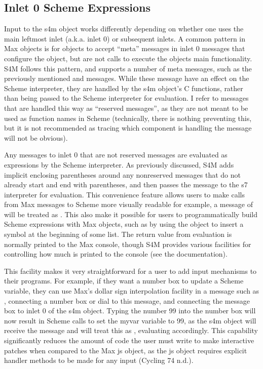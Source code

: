 \documentclass[letterpaper,10pt,english]{sphinxmanual}
\begin{document}
\subsection{Inlet 0 Scheme Expressions}
\label{\detokenize{features_usage:inlet-0-scheme-expressions}}
\sphinxAtStartPar
Input to the s4m object works differently depending on whether one uses the main left\sphinxhyphen{}most inlet (a.k.a. inlet 0) or subsequent inlets.
A common pattern in Max objects is for objects to accept “meta” messages in inlet 0 \sphinxhyphen{} messages that configure the object,
but are not calls to execute the objects main functionality.
S4M follows this pattern, and supports a number of meta messages, such as the previously mentioned  and  messages.
While these message have an effect on the Scheme interpreter, they are handled by the s4m object’s C functions,
rather than being passed to the Scheme interpreter for evaluation.
I refer to messages that are handled this way as “reserved messages”, as they are not meant to be used
as function names in Scheme (technically, there is nothing preventing this, but it is not recommended
as tracing which component is handling the message will not be obvious).

\sphinxAtStartPar
Any messages to inlet 0 that are not reserved messages are evaluated as expressions by the Scheme interpreter.
As previously discussed, S4M adds implicit enclosing parentheses around any non\sphinxhyphen{}reserved messages that do not already start
and end with parentheses, and then passes the message to the s7 interpreter for evaluation.
This convenience feature allows users to make calls from Max messages to Scheme more visually readable \sphinxhyphen{} for example,
a message of  will be treated as . This also make it possible for users
to programmatically build Scheme expressions with Max objects, such as by using the  object to insert
a symbol at the beginning of some list.
The return value from evaluation is normally printed to the Max console, though S4M provides various facilities for controlling
how much is printed to the console (see the documentation).

\sphinxAtStartPar
This facility makes it very straightforward for a user to add input mechanisms to their programs.
For example, if they want a number box to update a Scheme variable, they can use Max’s dollar sign interpolation facility
in a message such as , connecting a number box or dial to this message, and connecting the message box to inlet 0
of the s4m object.
Typing the number 99 into the number box will now result in Scheme calls to set the my\sphinxhyphen{}var variable to 99, as the s4m object
will receive the message  and will treat this as , evaluating accordingly.
This capability significantly reduces the amount of code the user must write to make interactive patches when compared to the Max js object,
as the js object requires explicit handler methods to be made for any input (Cycling 74 n.d.).
\end{document}
